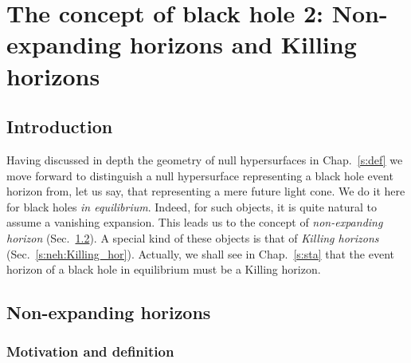 \chapter{The concept of black hole 2: Non-expanding horizons and Killing horizons}
\label{s:neh}

\minitoc

\section{Introduction}

Having discussed in depth the geometry of null hypersurfaces in Chap.~\ref{s:def}
we move forward to distinguish a null hypersurface representing a black hole event horizon from, let us say, that representing a mere future light cone. We do it here for black holes
\emph{in equilibrium}. Indeed, for such objects, it is quite natural
to assume a vanishing expansion. This leads us to the concept of \emph{non-expanding
horizon} (Sec.~\ref{s:neh:neh}). A special kind of these objects is that
of \emph{Killing horizons} (Sec.~\ref{s:neh:Killing_hor}). Actually, we shall
see in Chap.~\ref{s:sta} that the event horizon of a black hole in equilibrium
must be a Killing horizon.



\section{Non-expanding horizons} \label{s:neh:neh}

\subsection{Motivation and definition} \label{s:neh:def}


